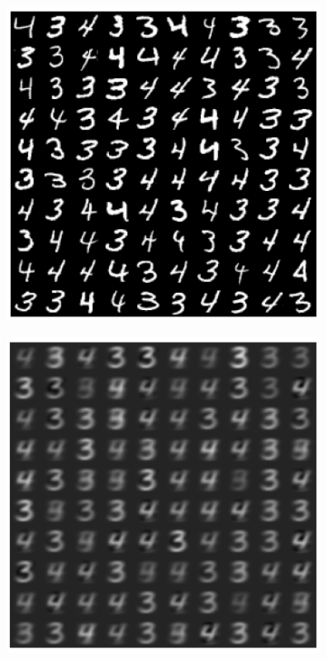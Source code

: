 \begin{figure}
    \centering
    \begin{subfigure}{0.49\linewidth}
        \includegraphics[width=\linewidth]{Pics/05_methodology/3_4_original.png}
    \end{subfigure}
    \begin{subfigure}{0.49\linewidth}
        \includegraphics[width=\linewidth]{Pics/05_methodology/3_4_decomp.png}

\end{subfigure}
\end{figure}
